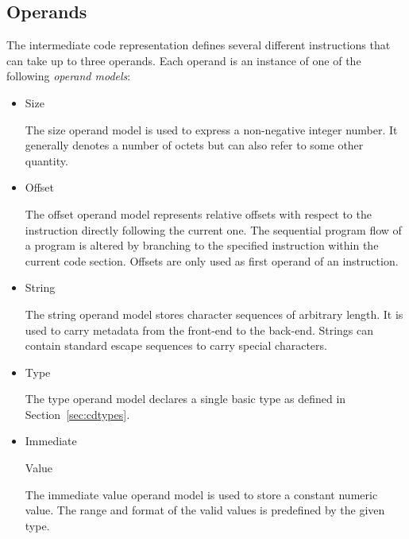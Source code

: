 \subsection{Operands}\label{sec:cdoperands}

The intermediate code representation defines several different instructions that can take up to three operands.
Each operand is an instance of one of the following \emph{operand models}:

\newcommand{\cdoperand}[1]{\hypertarget{cd:#1}{#1}}
\newcommand{\cdoperandref}[1]{\hyperlink{cd:#1}{\textit{#1}}}

\begin{itemize}

\item\cdoperand{Size}\alignright{}\nopagebreak

The size operand model is used to express a non-negative integer number.
It generally denotes a number of octets but can also refer to some other quantity.

\item\cdoperand{Offset}\alignright{}\nopagebreak

The offset operand model represents relative offsets with respect to the instruction directly following the current one.
The sequential program flow of a program is altered by branching to the specified instruction within the current code section.
Offsets are only used as first operand of an instruction.

\item\cdoperand{String}\alignright{}\nopagebreak

The string operand model stores character sequences of arbitrary length.
It is used to carry metadata from the front-end to the back-end.
Strings can contain standard escape sequences to carry special characters.

\item\cdoperand{Type}\alignright{}\nopagebreak

The type operand model declares a single basic type as defined in Section~\ref{sec:cdtypes}.

\item\cdoperand{Immediate} Value\alignright{}\nopagebreak

The immediate value operand model is used to store a constant numeric value.
The range and format of the valid values is predefined by the given type.


\end{itemize}
